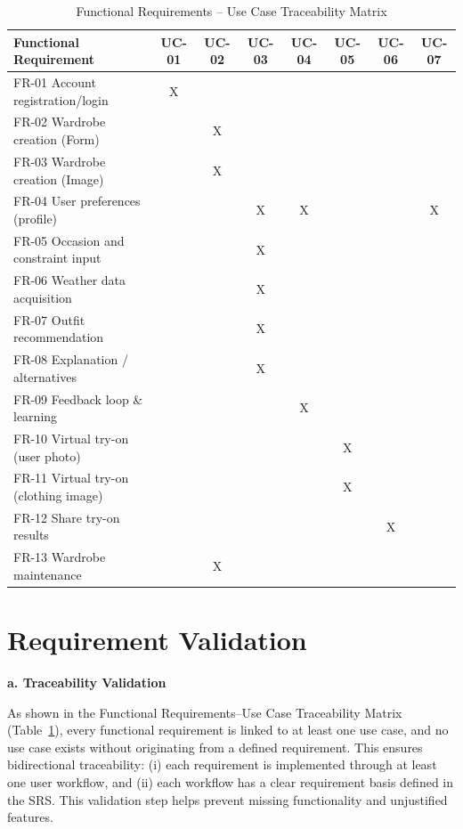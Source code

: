 \begin{table}[H]
\centering
\caption{Functional Requirements -- Use Case Traceability Matrix}
\label{tab:fr_uc_matrix}
\small
\setlength{\tabcolsep}{3pt}
\renewcommand{\arraystretch}{1.5}
\begin{tabular}{p{4cm} | c c c c c c c}
\toprule
\textbf{Functional Requirement} &
\textbf{UC-01} &
\textbf{UC-02} &
\textbf{UC-03} &
\textbf{UC-04} &
\textbf{UC-05} &
\textbf{UC-06} &
\textbf{UC-07} \\
\midrule
FR-01 Account registration/login                 & X &   &   &   &   &   &   \\
FR-02 Wardrobe creation (Form)                   &   & X &   &   &   &   &   \\
FR-03 Wardrobe creation (Image)                  &   & X &   &   &   &   &   \\
FR-04 User preferences (profile)                 &   &   & X & X &   &   & X \\
FR-05 Occasion and constraint input              &   &   & X &   &   &   &   \\
FR-06 Weather data acquisition                   &   &   & X &   &   &   &   \\
FR-07 Outfit recommendation                      &   &   & X &   &   &   &   \\
FR-08 Explanation / alternatives                 &   &   & X &   &   &   &   \\
FR-09 Feedback loop \& learning                  &   &   &   & X &   &   &   \\
FR-10 Virtual try-on (user photo)                &   &   &   &   & X &   &   \\
FR-11 Virtual try-on (clothing image)            &   &   &   &   & X &   &   \\
FR-12 Share try-on results                       &   &   &   &   &   & X &   \\
FR-13 Wardrobe maintenance                       &   & X &   &   &   &   &   \\
\bottomrule
\end{tabular}
\end{table}


\section{Requirement Validation}
\textbf{\large a. Traceability Validation}

As shown in the Functional Requirements--Use Case Traceability Matrix
(Table~\ref{tab:fr_uc_matrix}), every functional requirement is linked to at least
one use case, and no use case exists without originating from a defined
requirement. This ensures bidirectional traceability: (i) each requirement is
implemented through at least one user workflow, and (ii) each workflow has a
clear requirement basis defined in the SRS. This validation step helps prevent
missing functionality and unjustified features.\\

